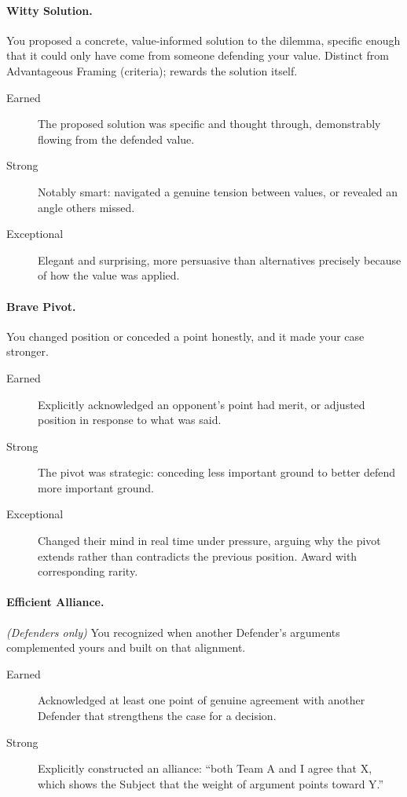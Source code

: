 \paragraph{Witty Solution.} You proposed a concrete, value-informed solution to the dilemma, specific enough that it could only have come from someone defending your value. Distinct from Advantageous Framing (criteria); rewards the solution itself.
\begin{description}
    \item[Earned] The proposed solution was specific and thought through, demonstrably flowing from the defended value.
    \item[Strong] Notably smart: navigated a genuine tension between values, or revealed an angle others missed.
    \item[Exceptional] Elegant and surprising, more persuasive than alternatives precisely because of how the value was applied.
\end{description}

\paragraph{Brave Pivot.} You changed position or conceded a point honestly, and it made your case stronger.
\begin{description}
    \item[Earned] Explicitly acknowledged an opponent's point had merit, or adjusted position in response to what was said.
    \item[Strong] The pivot was strategic: conceding less important ground to better defend more important ground.
    \item[Exceptional] Changed their mind in real time under pressure, arguing why the pivot extends rather than contradicts the previous position. Award with corresponding rarity.
\end{description}

\paragraph{Efficient Alliance.} \textit{(Defenders only)} You recognized when another Defender's arguments complemented yours and built on that alignment.
\begin{description}
    \item[Earned] Acknowledged at least one point of genuine agreement with another Defender that strengthens the case for a decision.
    \item[Strong] Explicitly constructed an alliance: ``both Team A and I agree that X, which shows the Subject that the weight of argument points toward Y.''
\end{description}

